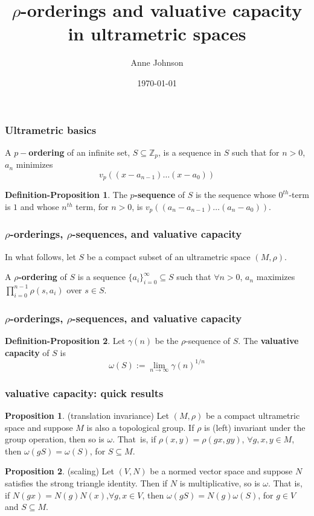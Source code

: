 \documentclass{beamer}
\title{$\rho$-orderings and valuative capacity in ultrametric spaces}
\author{Anne Johnson}
\date{\today}
\theoremstyle{definition}
\newtheorem*{proposition*}{Proposition}
\newtheorem{definition_proposition}{Definition-Proposition}
\begin{document}
\maketitle


\begin{frame}
\frametitle{Ultrametric basics}
\begin{definition}
A \textbf{$p-$ordering} of an infinite set, $S \subseteq \mathbb{Z}_p$, is a sequence in $S$ such that for $n > 0$, $a_n$ minimizes
\[v_p((x - a_{n-1}) \ldots (x - a_0))\] 
\end{definition}

\begin{definition_proposition}
 The \textbf{$p$-sequence} of $S$ is the sequence whose $0^{th}$-term is $1$ and whose $n^{th}$ term, for $n >0$, is $v_p ((a_n-a_{n-1}) \ldots (a_n - a_0))$.
\end{definition_proposition}

\end{frame}


\begin{frame}
\frametitle{$\rho$-orderings, $\rho$-sequences, and valuative capacity}
In what follows, let $S$ be a compact subset of an ultrametric space $(M,\rho)$.
\begin{definition}
\cite{kj} A \textbf{$\rho$-ordering} of $S$ is a sequence $\{a_i\}_{i=0}^\infty \subseteq S$ such that $\forall n > 0$, $a_n$ maximizes $\prod_{i=0}^{n-1} \rho(s,a_i)$ over $s \in S$. 
\end{definition}



\end{frame}

\begin{frame}
\frametitle{$\rho$-orderings, $\rho$-sequences, and valuative capacity}
\begin{definition_proposition}
\cite{kj}  Let $\gamma(n)$ be the $\rho$-sequence of $S$. The \textbf{valuative capacity} of $S$ is \[\omega(S)
 := \lim_{n\to\infty} \gamma(n)^{1/n}\]  
\end{definition_proposition}

\end{frame}


\begin{frame}
\frametitle{valuative capacity: quick results}
\begin{proposition*}
	(translation invariance) Let $(M, \rho)$ be a compact ultrametric space and suppose $M$ is also a topological group. If $\rho$ is (left) invariant under the group operation, then so is $\omega$. That\ is, if $\rho(x,y)=\rho(gx,gy)$, $ \forall g,x,y \in M$, then $\omega(gS)=\omega(S)$, for $S \subseteq M$.	
\end{proposition*}

\begin{proposition*}
(scaling) Let $(V, N)$ be a normed vector space and suppose $N$ satisfies the strong triangle identity. Then if $N$ is multiplicative, so is $\omega$. That is, if $N(gx)=N(g)N(x)$,$\forall g,x \in V$, then $\omega(gS) = N(g)  \omega(S)$, for $g \in V$ and $S \subseteq M$. 
\end{proposition*}
\end{frame}
\end{document}

